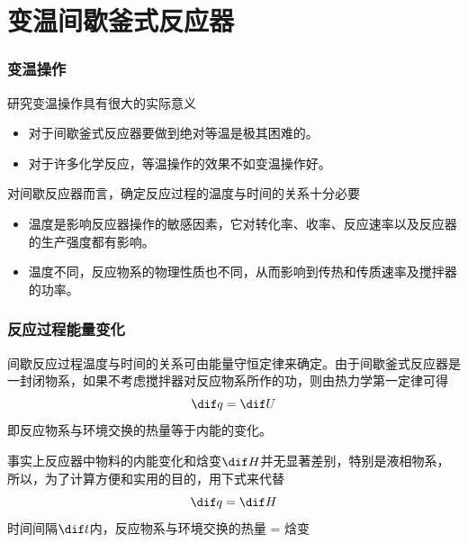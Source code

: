 \section{变温间歇釜式反应器}


\begin{frame}
    \frametitle{变温操作}

    \large 研究变温操作具有很大的实际意义
    \begin{itemize}
        \item[\bullet] 对于间歇釜式反应器要做到绝对等温是极其困难的。
        \item[\bullet] 对于许多化学反应，等温操作的效果不如变温操作好。
    \end{itemize}
    
    对间歇反应器而言，确定反应过程的温度与时间的关系十分必要
    \begin{itemize}
        \item[\bullet] 温度是影响反应器操作的敏感因素，它对转化率、收率、反应速率以及反应器的生产强度都有影响。
        \item[\bullet] 温度不同，反应物系的物理性质也不同，从而影响到传热和传质速率及搅拌器的功率。
    \end{itemize}

\end{frame}


\begin{frame}
    \frametitle{反应过程能量变化}

    \large 间歇反应过程温度与时间的关系可由能量守恒定律来确定。由于间歇釜式反应器是一封闭物系，如果不考虑搅拌器对反应物系所作的功，则由热力学第一定律可得
    \[
        \dif q = \dif U
    \]
    即反应物系与环境交换的热量等于内能的变化。
    
    事实上反应器中物料的内能变化和焓变$\dif H$并无显著差别，特别是液相物系，所以，为了计算方便和实用的目的，用下式来代替
    \[
        \dif q = \dif H
    \]
    时间间隔$\dif t$内，反应物系与环境交换的热量 = 焓变

\end{frame}



